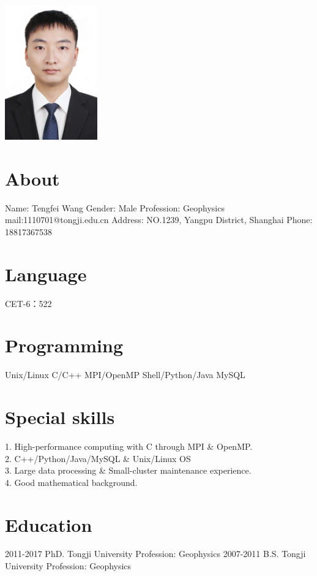 \documentclass[]{friggeri-encv}
\begin{document}
       {}
\begin{aside}
\includegraphics[width=4cm]{IMG_4827small.jpg}
  \section{About}
  Name: Tengfei Wang
  Gender: Male
  Profession: \qquad Geophysics
  mail:1110701@tongji.edu.cn
  Address: NO.1239, Yangpu District, Shanghai
  Phone: 18817367538
  \section{Language}
  CET-6：522
  \section{Programming}
	Unix/Linux
    C/C++
	MPI/OpenMP
    Shell/Python/Java
	MySQL
\end{aside}

\section{Special skills}
\large
1. High-performance computing with C through MPI \& OpenMP. \\
2. C++/Python/Java/MySQL \& Unix/Linux OS \\
3. Large data processing \& Small-cluster maintenance experience. \\
4. Good mathematical background.

\section{Education}
\begin{entrylist}
  \entryTwo
    {2011-2017}
    {PhD. \quad Tongji University \quad Profession: Geophysics}
  \entryTwo
    {2007-2011}
    {B.S. \quad Tongji University \quad Profession: Geophysics}
\end{entrylist}
\end{document}
